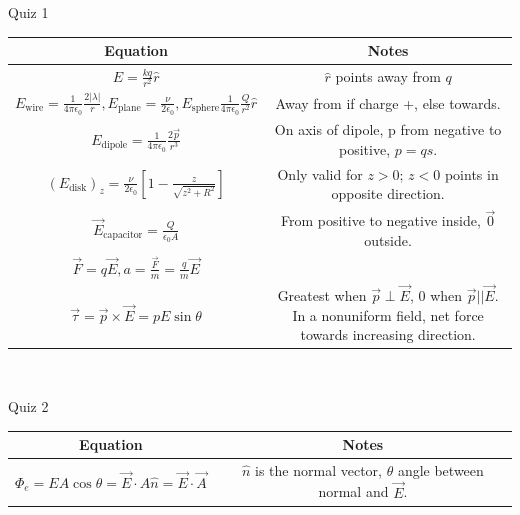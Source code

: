 \documentclass{article}
\begin{document}
\begin{center}
	\begin{section}{Quiz 1}
	 \begin{tabular}{|c|c|}
		 \hline Equation                                                                              & Notes                                                                     \\
		 \hline
		 $E = \frac{kq}{r^2} \hat r$                                                                  & $\hat r$ points away from $q$                                             \\
		 $E_\text{wire} = \frac{1}{4 \pi \epsilon_0} \frac{2 | \lambda |}{r},
			 E_\text{plane} = \frac{\nu}{2 \epsilon_0},

		 E_\text{sphere} \frac{1}{4 \pi \epsilon_0} \frac{Q}{r^2} \hat r $                            & Away from if charge +, else towards.                                      \\

		 $E_\text{dipole} = \frac{1}{4 \pi \epsilon_0} \frac{2 \vec p}{r^3}$                          & On axis of dipole, p from negative to positive, $p = qs$.                 \\

		 $(E_\text{disk})_z = \frac{\nu}{2 \epsilon_0} \left[ 1 - \frac{z}{\sqrt{z^2 + R^2}} \right]$ & Only valid for $z > 0$; $z < 0$ points in opposite direction.             \\

		 $\vec E_\text{capacitor} = \frac{Q}{\epsilon_0 A}$                                           & From positive to negative inside, $\vec 0$ outside.                       \\


		 $\vec F = q \vec E, a = \frac{ \vec F}{m} = \frac{q}{m} \vec E$                              &                                                                           \\

		 $\vec \tau = \vec p \times \vec E = pE \sin \theta $                                         & \makecell{Greatest when $\vec p \perp \vec E$, 0 when $\vec p || \vec E$. \\ In a nonuniform field, net force towards increasing direction.} \\

		 \hline
	 \end{tabular}
	 \\
	\end{section}
	\begin{section}{Quiz 2}
	 \begin{tabular}{|c|c|}
		 \hline Equation                                                                              & Notes                                                                      \\
		 \hline $\Phi_e = E A \cos \theta = \vec E \cdot A \hat n = \vec E \cdot \vec A$              & $\hat n$ is the normal vector, $\theta$ angle between normal and $\vec E$. \\



\end{tabular}
\end{section}
\end{center}
\end{document}
